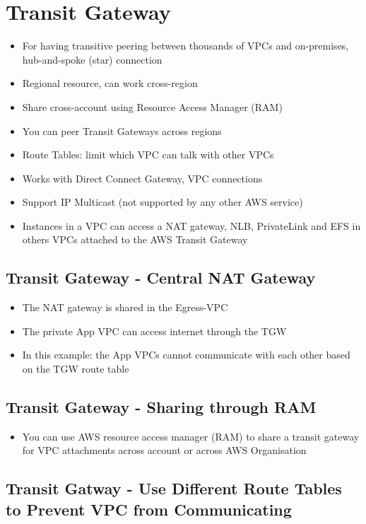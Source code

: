 \section{Transit Gateway}
\begin{itemize}
    \item For having transitive peering between thousands of VPCs and on-premises, hub-and-spoke (star) connection
    \item Regional resource, can work cross-region
    \item Share cross-account using Resource Access Manager (RAM)
    \item You can peer Transit Gateways across regions
    \item Route Tables: limit which VPC can talk with other VPCs
    \item Works with Direct Connect Gateway, VPC connections
    \item Support IP Multicast (not supported by any other AWS service)
    \item Instances in a VPC can access a NAT gateway, NLB, PrivateLink and EFS in others VPCs attached to the AWS Transit Gateway
\end{itemize}

\subsection{Transit Gateway - Central NAT Gateway}
\begin{itemize}
    \item The NAT gateway is shared in the Egress-VPC
    \item The private App VPC can access internet through the TGW
    \item In this example: the App VPCs cannot communicate with each other based on the TGW route table
\end{itemize}

\subsection{Transit Gateway - Sharing through RAM}
\begin{itemize}
    \item You can use AWS resource access manager (RAM) to share a transit gateway for VPC attachments across account or across AWS Organisation
\end{itemize}

\subsection{Transit Gatway - Use Different Route Tables to Prevent VPC from Communicating}

